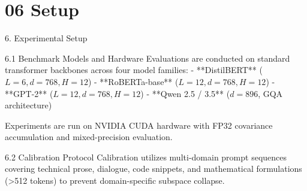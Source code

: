 \section{06 Setup}

 6. Experimental Setup

 6.1 Benchmark Models and Hardware
Evaluations are conducted on standard transformer backbones across four model families:
- **DistilBERT** ($L=6, d=768, H=12$)
- **RoBERTa-base** ($L=12, d=768, H=12$)
- **GPT-2** ($L=12, d=768, H=12$)
- **Qwen 2.5 / 3.5** ($d=896$, GQA architecture)

Experiments are run on NVIDIA CUDA hardware with FP32 covariance accumulation and mixed-precision evaluation.

 6.2 Calibration Protocol
Calibration utilizes multi-domain prompt sequences covering technical prose, dialogue, code snippets, and mathematical formulations (>512 tokens) to prevent domain-specific subspace collapse.
